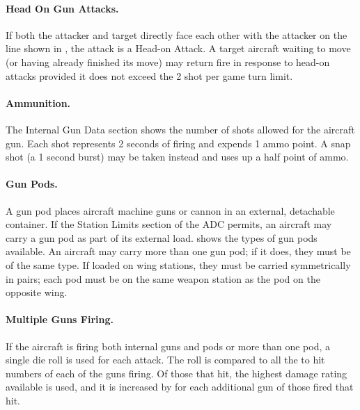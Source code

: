 \paragraph{Head On Gun Attacks.} If both the attacker and target directly face each other with the attacker on the  line shown in , the attack is a Head-on Attack. A target aircraft waiting to move (or having already finished its move) may return fire in response to head-on attacks provided it does not exceed the 2 shot per game turn limit.  

\paragraph{Ammunition.} 
The Internal Gun Data section shows the number of shots allowed for the aircraft gun. Each shot represents 2 seconds of firing and expends 1 ammo point. A snap shot (a 1 second burst) may be taken instead and uses up a half point of ammo.

\paragraph{Gun Pods.} 
A gun pod places aircraft machine guns or cannon in an external, detachable container. If the Station Limits section of the ADC permits, an aircraft may carry a gun pod as part of its external load.  shows the types of gun pods available. An aircraft may carry more than one gun pod; if it does, they must be of the same type. If loaded on wing stations, they must be carried symmetrically in pairs; each pod must be on the same weapon station as the pod on the opposite wing.

\paragraph{Multiple Guns Firing.} 
If the aircraft is firing both internal guns and pods or more than one pod, a single die roll is used for each attack. The roll is compared to all the to hit numbers of each of the guns firing. Of those that hit, the highest damage rating available is used, and it is increased by  for each additional gun of those fired that hit.

